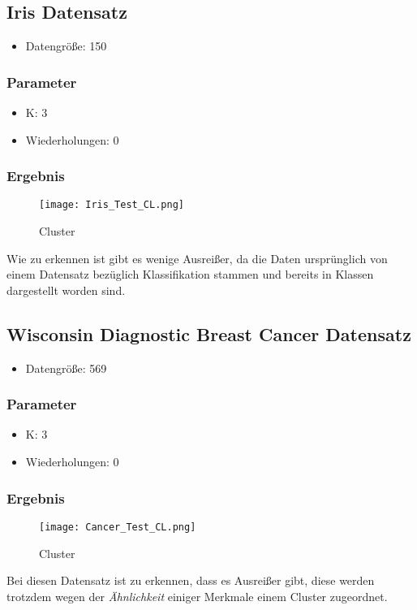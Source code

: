 \subsection{Iris Datensatz}
\begin{itemize}
	\item Datengröße: 150
\end{itemize}
\subsubsection{Parameter}
\begin{itemize}
	\item K: 3 
	\item Wiederholungen: 0
\end{itemize}
\subsubsection{Ergebnis}
\begin{figure}[H]
\texttt{[image: Iris\_Test\_CL.png]}
\caption{Cluster}
\end{figure}

Wie zu erkennen ist gibt es wenige Ausreißer, da die Daten ursprünglich von einem Datensatz bezüglich Klassifikation stammen und bereits in Klassen dargestellt worden sind. 
\cite{uci}
\subsection{Wisconsin Diagnostic Breast Cancer Datensatz}
\begin{itemize}
	\item Datengröße: 569
\end{itemize}
\subsubsection{Parameter}
\begin{itemize}
	\item K: 3 
	\item Wiederholungen: 0
\end{itemize}
\subsubsection{Ergebnis}
\begin{figure}[H]
\texttt{[image: Cancer\_Test\_CL.png]}
\caption{Cluster}
\end{figure}
Bei diesen Datensatz ist zu erkennen, dass es Ausreißer gibt,  diese werden trotzdem wegen der \textit{Ähnlichkeit} einiger Merkmale einem Cluster zugeordnet.
\cite{uci}
